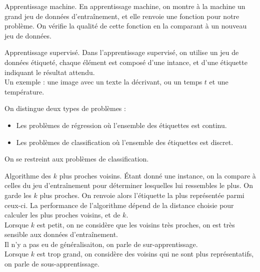 \documentclass[french, 11pt]{article}
\begin{document}


\renewcommand*{\E}{\mathbb{E}}
\renewcommand*{\P}{\mathbb{P}}

\begin{defi}{Apprentissage machine.}{}
    En apprentissage machine, on montre à la machine un grand jeu de données d'entraînement, et elle renvoie une fonction pour notre problème. On vérifie la qualité de cette fonction en la comparant à un nouveau jeu de données.
\end{defi}

\vspace*{-0.4cm}

\begin{defi}{Apprentissage supervisé.}{}
    Dans l'apprentissage supervisé, on utilise un jeu de données étiqueté, chaque élément est composé d'une intance, et d'une étiquette indiquant le résultat attendu.\\
    Un exemple : une image avec un texte la décrivant, ou un temps $t$ et une température. 
\end{defi}

\vspace*{-0.4cm}

\begin{defi}{}{}
    On distingue deux types de problèmes :
    \begin{itemize}
        \item Les problèmes de régression où l'ensemble des étiquettes est continu.
        \item Les problèmes de classification où l'ensemble des étiquettes est discret.
    \end{itemize}
    On se restreint aux problèmes de classification.
\end{defi}

\vspace*{-0.4cm}

\begin{defi}{Algorithme des $k$ plus proches voisins.}{}
    Étant donné une instance, on la compare à celles du jeu d'entraînement pour déterminer lesquelles lui ressembles le plus. On garde les $k$ plus proches. On renvoie alors l'étiquette la plus représentée parmi ceux-ci. La performance de l'algorithme dépend de la distance choisie pour calculer les plus proches voisins, et de $k$.\\
    Lorsque $k$ est petit, on ne considère que les voisins très proches, on est très sensible aux données d'entraînement.\\
    Il n'y a pas eu de généralisaiton, on parle de sur-apprentissage.\\
    Lorsque $k$ est trop grand, on considère des voisins qui ne sont plus représentatifs, on parle de sous-apprentissage.
\end{defi}
\end{document}
